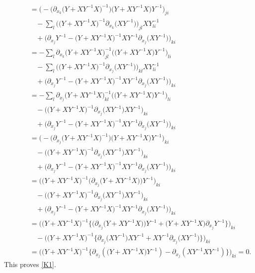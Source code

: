 \documentclass[10pt,a4paper]{amsart}
\numberwithin{equation}{section}
\begin{document}
\begin{gather*}
\phantom{\qquad-}{}= \bigl(-\bigl(\partial_{x_k}\bigl(Y+XY^{-1}X\bigr)^{-1}\bigr)\bigl(Y+XY^{-1}X\bigr)Y^{-1}\bigr)_{ji}\\
\phantom{\qquad-=}{} -\sum_l\bigl(\bigl(Y+XY^{-1}X\bigr)^{-1}\partial_{x_k}\bigl(XY^{-1}\bigr)\bigr)_{jl}XY^{-1}_{li}\\
\phantom{\qquad-=}{} +\bigl(\partial_{x_j}Y^{-1}-\bigl(Y+XY^{-1}X\bigr)^{-1}XY^{-1}\partial_{x_j}\bigl(XY^{-1}\bigr)\bigr)_{ki}\\
\phantom{\qquad-}{}= -\sum_l\partial_{x_k}\bigl(Y+XY^{-1}X\bigr)^{-1}_{jl}\bigl(\bigl(Y+XY^{-1}X\bigr)Y^{-1}\bigr)_{li}\\
\phantom{\qquad-=}{} -\sum_l\bigl(\bigl(Y+XY^{-1}X\bigr)^{-1}\partial_{x_j}\bigl(XY^{-1}\bigr)\bigr)_{kl}XY^{-1}_{li}\\
\phantom{\qquad-=}{} +\bigl(\partial_{x_j}Y^{-1}-\bigl(Y+XY^{-1}X\bigr)^{-1}XY^{-1}\partial_{x_j}\bigl(XY^{-1}\bigr)\bigr)_{ki} \\
\phantom{\qquad-}{}= -\sum_l\partial_{x_j}\bigl(Y+XY^{-1}X\bigr)^{-1}_{kl}\bigl(\bigl(Y+XY^{-1}X\bigr)Y^{-1}\bigr)_{li}\\
\phantom{\qquad-=}{} -\bigl(\bigl(Y+XY^{-1}X\bigr)^{-1}\partial_{x_j}\bigl(XY^{-1}\bigr)XY^{-1}\bigr)_{ki}\\
\phantom{\qquad-=}{} +\bigl(\partial_{x_j}Y^{-1}-\bigl(Y+XY^{-1}X\bigr)^{-1}XY^{-1}\partial_{x_j}\bigl(XY^{-1}\bigr)\bigr)_{ki} \\
\phantom{\qquad-}{}= \bigl(-\bigl(\partial_{x_j}\bigl(Y+XY^{-1}X\bigr)^{-1}\bigr)\bigl(Y+XY^{-1}X\bigr)Y^{-1}\bigr)_{ki}\\
\phantom{\qquad-=}{} -\bigl(\bigl(Y+XY^{-1}X\bigr)^{-1}\partial_{x_j}\bigl(XY^{-1}\bigr)XY^{-1}\bigr)_{ki}\\
\phantom{\qquad-=}{} +\bigl(\partial_{x_j}Y^{-1}-\bigl(Y+XY^{-1}X\bigr)^{-1}XY^{-1}\partial_{x_j}\bigl(XY^{-1}\bigr)\bigr)_{ki} \\
\phantom{\qquad-}{}= \bigl(\bigl(Y+XY^{-1}X\bigr)^{-1}\bigl(\partial_{x_j}\bigl(Y+XY^{-1}X\bigr)\bigr)Y^{-1}\bigr)_{ki}\\
\phantom{\qquad-=}{} -\bigl(\bigl(Y+XY^{-1}X\bigr)^{-1}\partial_{x_j}\bigl(XY^{-1}\bigr)XY^{-1}\bigr)_{ki}\\
\phantom{\qquad-=}{} +\bigl(\partial_{x_j}Y^{-1}-\bigl(Y+XY^{-1}X\bigr)^{-1}XY^{-1}\partial_{x_j}\bigl(XY^{-1}\bigr)\bigr)_{ki}
\\
\phantom{\qquad-}{}=\bigl( \bigl(Y+XY^{-1}X\bigr)^{-1}\big\{\bigl(\partial_{x_j}\bigl(Y+XY^{-1}X\bigr)\bigr)Y^{-1}+\bigl(Y+XY^{-1}X\bigr)\partial_{x_j}Y^{-1}\big\}\bigr)_{ki}\\
\phantom{\qquad-=}{}-\bigl( \bigl(Y+XY^{-1}X\bigr)^{-1}\big\{\partial_{x_j}\bigl(XY^{-1}\bigr)XY^{-1}+XY^{-1}\partial_{x_j}\bigl(XY^{-1}\bigr)\big\}\bigr)_{ki}\\
\phantom{\qquad-}{}=\bigl(\bigl(Y+XY^{-1}X\bigr)^{-1}\big\{\partial_{x_j}(\bigl(Y+XY^{-1}X\bigr)Y^{-1})-\partial_{x_j}(XY^{-1}XY^{-1})\big\}\bigr)_{ki}=0.
\end{gather*}
This proves \eqref{K1}.
\end{document}
